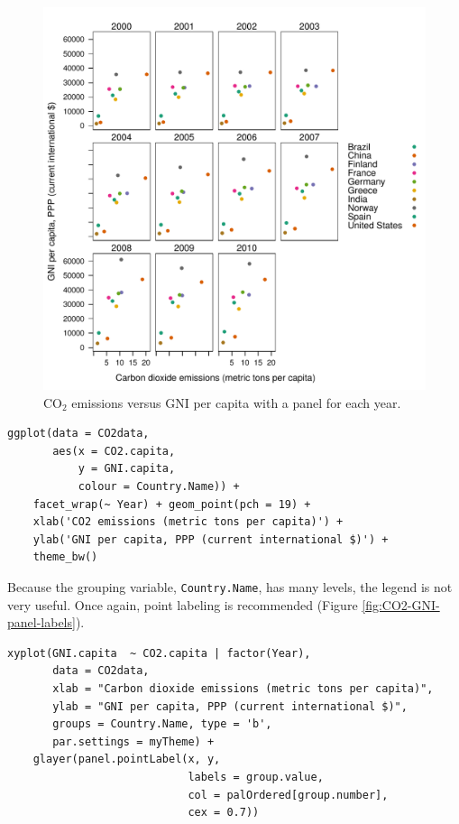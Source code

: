 \documentclass[smallroyalvopaper]{memoir}
\begin{document}
\begin{figure}[htbp]
\centering
\includegraphics[width=.9\linewidth]{figs/CO2_capita_panel.pdf}
\caption{\(\mathrm{CO_2}\) emissions versus GNI per capita with a panel for each year. \label{fig:CO2-GNI-panel}}
\end{figure}

\lstset{language=r,label= ,caption= ,captionpos=b,numbers=none}
\begin{lstlisting}
ggplot(data = CO2data,
       aes(x = CO2.capita,
           y = GNI.capita,
           colour = Country.Name)) +
    facet_wrap(~ Year) + geom_point(pch = 19) + 
    xlab('CO2 emissions (metric tons per capita)') +
    ylab('GNI per capita, PPP (current international $)') +
    theme_bw()
\end{lstlisting}

Because the grouping variable, \texttt{Country.Name}, has many levels, the
legend is not very useful. Once again, point labeling is recommended
(Figure \ref{fig:CO2-GNI-panel-labels}).

\lstset{language=r,label= ,caption= ,captionpos=b,numbers=none}
\begin{lstlisting}
xyplot(GNI.capita  ~ CO2.capita | factor(Year),
       data = CO2data,
       xlab = "Carbon dioxide emissions (metric tons per capita)",
       ylab = "GNI per capita, PPP (current international $)",
       groups = Country.Name, type = 'b',
       par.settings = myTheme) + 
    glayer(panel.pointLabel(x, y,
                            labels = group.value,
                            col = palOrdered[group.number],
                            cex = 0.7))
\end{lstlisting}
\end{document}
